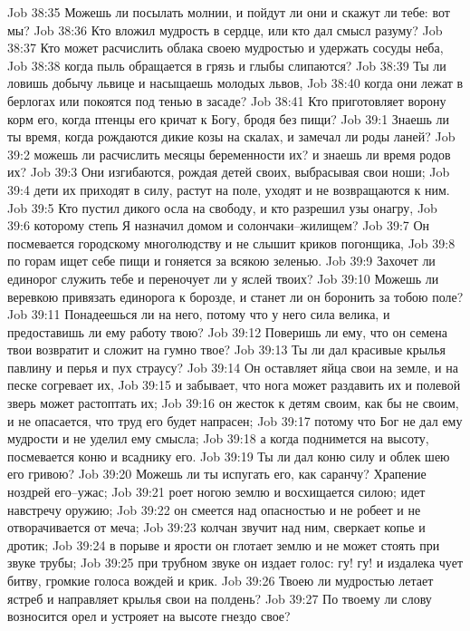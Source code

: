 Job 38:35  Можешь ли посылать молнии, и пойдут ли они и скажут ли тебе: вот мы?
Job 38:36  Кто вложил мудрость в сердце, или кто дал смысл разуму?
Job 38:37  Кто может расчислить облака своею мудростью и удержать сосуды неба,
Job 38:38  когда пыль обращается в грязь и глыбы слипаются?
Job 38:39  Ты ли ловишь добычу львице и насыщаешь молодых львов,
Job 38:40  когда они лежат в берлогах или покоятся под тенью в засаде?
Job 38:41  Кто приготовляет ворону корм его, когда птенцы его кричат к Богу, бродя без пищи?
Job 39:1  Знаешь ли ты время, когда рождаются дикие козы на скалах, и замечал ли роды ланей?
Job 39:2  можешь ли расчислить месяцы беременности их? и знаешь ли время родов их?
Job 39:3  Они изгибаются, рождая детей своих, выбрасывая свои ноши;
Job 39:4  дети их приходят в силу, растут на поле, уходят и не возвращаются к ним.
Job 39:5  Кто пустил дикого осла на свободу, и кто разрешил узы онагру,
Job 39:6  которому степь Я назначил домом и солончаки--жилищем?
Job 39:7  Он посмевается городскому многолюдству и не слышит криков погонщика,
Job 39:8  по горам ищет себе пищи и гоняется за всякою зеленью.
Job 39:9  Захочет ли единорог служить тебе и переночует ли у яслей твоих?
Job 39:10  Можешь ли веревкою привязать единорога к борозде, и станет ли он боронить за тобою поле?
Job 39:11  Понадеешься ли на него, потому что у него сила велика, и предоставишь ли ему работу твою?
Job 39:12  Поверишь ли ему, что он семена твои возвратит и сложит на гумно твое?
Job 39:13  Ты ли дал красивые крылья павлину и перья и пух страусу?
Job 39:14  Он оставляет яйца свои на земле, и на песке согревает их,
Job 39:15  и забывает, что нога может раздавить их и полевой зверь может растоптать их;
Job 39:16  он жесток к детям своим, как бы не своим, и не опасается, что труд его будет напрасен;
Job 39:17  потому что Бог не дал ему мудрости и не уделил ему смысла;
Job 39:18  а когда поднимется на высоту, посмевается коню и всаднику его.
Job 39:19  Ты ли дал коню силу и облек шею его гривою?
Job 39:20  Можешь ли ты испугать его, как саранчу? Храпение ноздрей его--ужас;
Job 39:21  роет ногою землю и восхищается силою; идет навстречу оружию;
Job 39:22  он смеется над опасностью и не робеет и не отворачивается от меча;
Job 39:23  колчан звучит над ним, сверкает копье и дротик;
Job 39:24  в порыве и ярости он глотает землю и не может стоять при звуке трубы;
Job 39:25  при трубном звуке он издает голос: гу! гу! и издалека чует битву, громкие голоса вождей и крик.
Job 39:26  Твоею ли мудростью летает ястреб и направляет крылья свои на полдень?
Job 39:27  По твоему ли слову возносится орел и устрояет на высоте гнездо свое?
